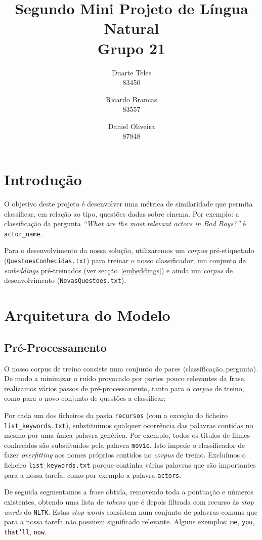 \documentclass[a4paper,twocolumn]{article}
\title{Segundo Mini Projeto de Língua Natural \\\medskip \small Grupo 21}
\author{Duarte Teles \\ 83450 \and Ricardo Brancas \\ 83557 \and Daniel Oliveira \\ 87848}
\begin{document}
\maketitle

\section{Introdução}

O objetivo deste projeto é desenvolver uma métrica de similaridade que permita classificar, em relação ao tipo, questões dadas sobre cinema.
Por exemplo: a classificação da pergunta \textit{``What are the most relevant actors in Bad Boys?''} é \texttt{actor\_name}.

Para o desenvolvimento da nossa solução, utilizaremos um \textit{corpus} pré-etiquetado (\texttt{QuestoesConhecidas.txt}) para treinar o nosso classificador; um conjunto de \textit{embeddings} pré-treinados (ver secção~\ref{embeddings}) e ainda um \textit{corpus} de desenvolvimento (\texttt{NovasQuestoes.txt}).

\section{Arquitetura do Modelo}

\subsection{Pré-Processamento}

O nosso corpus de treino consiste num conjunto de pares $ \langle \text{classificação}, \text{pergunta} \rangle $.
De modo a minimizar o ruído provocado por partes pouco relevantes da frase, realizamos vários passos de pré-processamento, tanto para o \textit{corpus} de treino, como para o novo conjunto de questões a classificar:
\medskip

Por cada um dos ficheiros da pasta \texttt{recursos} (com a exceção do ficheiro \texttt{list\_keywords.txt}), substituimos qualquer ocorrência das palavras contidas no mesmo por uma única palavra genérica.
Por exemplo, todos os títulos de filmes conhecidos são substituídos pela palavra \texttt{movie}. Isto impede o classificador de fazer \textit{overfitting} aos nomes próprios contidos no \textit{corpus} de treino.
Excluímos o ficheiro \texttt{list\_keywords.txt} porque continha várias palavras que são importantes para a nossa tarefa, como por exemplo a palavra \texttt{actors}.
\medskip
    
De seguida segmentamos a frase obtida, removendo toda a pontuação e números existentes, obtendo uma lista de \textit{tokens} que é depois filtrada com recurso às \textit{stop words} do \texttt{NLTK}\label{nltkusage}.
Estas \textit{stop words} consistem num conjunto de palavras comuns que para a nossa tarefa não possuem significado relevante. Alguns exemplos: \texttt{me}, \texttt{you}, \texttt{that'll}, \texttt{now}.
\medskip
\end{document}
